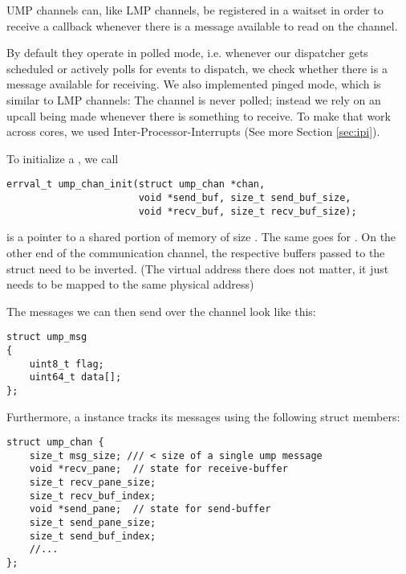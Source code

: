 UMP channels can, like LMP channels, be registered in a waitset in order to receive
a callback whenever there is a message available to read on the channel.

By default they operate in polled mode, i.e. whenever our dispatcher gets scheduled
or actively polls for events to dispatch, we check whether there is a message available for 
receiving. We also implemented pinged mode, which is similar to LMP channels: The channel
is never polled; instead we rely on an upcall being made whenever there is something to receive.
To make that work across cores, we used Inter-Processor-Interrupts (See more Section \ref{sec:ipi}).


To initialize a , we call
\begin{mdframed}[style=myframe]
\begin{verbatim}
errval_t ump_chan_init(struct ump_chan *chan,
                       void *send_buf, size_t send_buf_size,
                       void *recv_buf, size_t recv_buf_size);
\end{verbatim}
\end{mdframed}

 is a pointer to a shared portion of memory of size . The same
goes for . On the other end of the communication channel, the respective buffers
passed to the struct need to be inverted. (The virtual address there does not matter, it just
needs to be mapped to the same physical address)

The messages we can then send over the channel look like this:
\begin{mdframed}[style=myframe]
\begin{verbatim}
struct ump_msg
{
    uint8_t flag;
    uint64_t data[];
};
\end{verbatim}
\end{mdframed}


Furthermore, a  instance tracks its messages using the following struct members:
\begin{mdframed}[style=myframe]
\begin{verbatim}
struct ump_chan {
    size_t msg_size; /// < size of a single ump message
    void *recv_pane;  // state for receive-buffer
    size_t recv_pane_size;
    size_t recv_buf_index;
    void *send_pane;  // state for send-buffer
    size_t send_pane_size;
    size_t send_buf_index;
    //...
};
\end{verbatim}
\end{mdframed}

